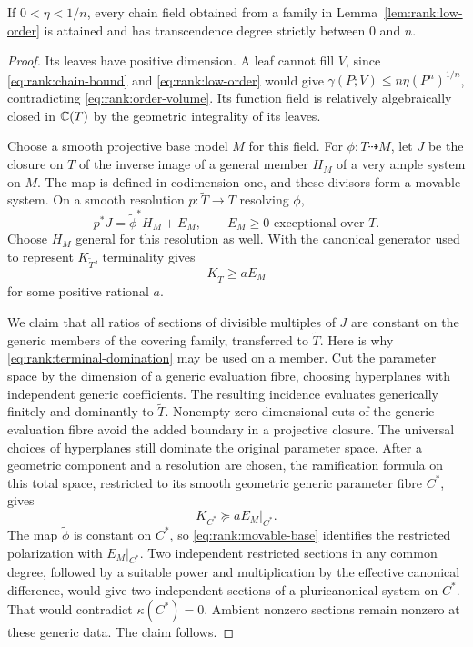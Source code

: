 \begin{lemma}\label{lem:rank:attainment}
If $0<\eta<1/n$, every chain field obtained from a family in
Lemma~\ref{lem:rank:low-order} is attained and has transcendence degree
strictly between $0$ and $n$.
\end{lemma}

\begin{proof}
Its leaves have positive dimension.  A leaf cannot fill $V$, since
\eqref{eq:rank:chain-bound} and \eqref{eq:rank:low-order} would give
$\gamma(P;V)\le n\eta(P^n)^{1/n}$, contradicting
\eqref{eq:rank:order-volume}.  Its function field is relatively
algebraically closed in $\mathbb C(T)$ by the geometric integrality of its
leaves.

Choose a smooth projective base model $M$ for this field.  For
$\phi:T\dashrightarrow M$, let $J$ be the closure on $T$ of the inverse
image of a general member $H_M$ of a very ample system on $M$.
The map is defined in codimension one, and these divisors form a movable
system.  On a smooth resolution $p:\widetilde T\to T$ resolving $\phi$,
\begin{equation}\label{eq:rank:movable-base}
            p^*J=\widetilde\phi^*H_M+E_M,
            \qquad E_M\ge0\text{ exceptional over }T.
\end{equation}
Choose $H_M$ general for this resolution as well.  With the canonical
generator used to represent $K_{\widetilde T}$, terminality gives
\begin{equation}\label{eq:rank:terminal-domination}
                         K_{\widetilde T}\ge aE_M
\end{equation}
for some positive rational $a$.

We claim that all ratios of sections of divisible multiples of $J$ are
constant on the generic members of the covering family, transferred to
$\widetilde T$.  Here is why \eqref{eq:rank:terminal-domination} may be
used on a member.  Cut the parameter space by the dimension of a generic
evaluation fibre, choosing hyperplanes with independent generic
coefficients.  The resulting incidence evaluates generically finitely
and dominantly to $\widetilde T$.  Nonempty zero-dimensional cuts of the
generic evaluation fibre avoid the added boundary in a projective
closure.  The universal choices of hyperplanes still dominate the
original parameter space.  After a geometric component and a resolution
are chosen, the ramification formula on this total space, restricted to
its smooth geometric generic parameter fibre $C^*$, gives
\[
                             K_{C^*}\succeq aE_M|_{C^*}.
\]
The map $\widetilde\phi$ is constant on $C^*$, so
\eqref{eq:rank:movable-base} identifies the restricted polarization with
$E_M|_{C^*}$.  Two independent restricted sections in any common degree,
followed by a suitable power and multiplication by the effective
canonical difference, would give two independent sections of a
pluricanonical system on $C^*$.  That would contradict $\kappa(C^*)=0$.
Ambient nonzero sections remain nonzero at these generic data.  The
claim follows.


\end{proof}
